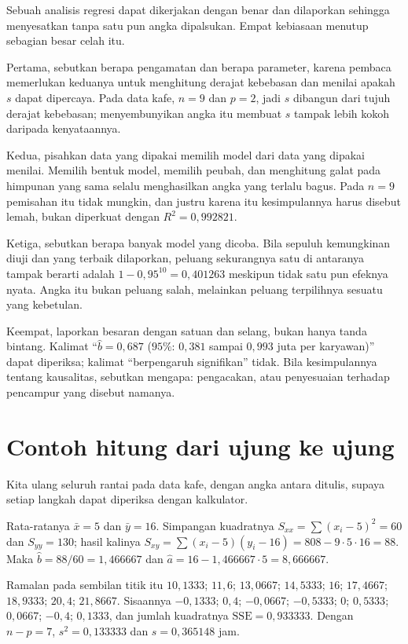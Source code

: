 Sebuah analisis regresi dapat dikerjakan dengan benar dan dilaporkan sehingga menyesatkan
tanpa satu pun angka dipalsukan. Empat kebiasaan menutup sebagian besar celah itu.

Pertama, sebutkan berapa pengamatan dan berapa parameter, karena pembaca memerlukan
keduanya untuk menghitung derajat kebebasan dan menilai apakah $s$ dapat dipercaya.
Pada data kafe, $n=9$ dan $p=2$, jadi $s$ dibangun dari tujuh derajat kebebasan;
menyembunyikan angka itu membuat $s$ tampak lebih kokoh daripada kenyataannya.

Kedua, pisahkan data yang dipakai memilih model dari data yang dipakai menilai.
Memilih bentuk model, memilih peubah, dan menghitung galat pada himpunan yang sama
selalu menghasilkan angka yang terlalu bagus. Pada $n=9$ pemisahan itu tidak mungkin,
dan justru karena itu kesimpulannya harus disebut lemah, bukan diperkuat dengan
$R^2=0{,}992821$.

Ketiga, sebutkan berapa banyak model yang dicoba. Bila sepuluh kemungkinan diuji dan
yang terbaik dilaporkan, peluang sekurangnya satu di antaranya tampak berarti adalah
$1-0{,}95^{10}=0{,}401263$ meskipun tidak satu pun efeknya nyata. Angka itu bukan
peluang salah, melainkan peluang terpilihnya sesuatu yang kebetulan.

Keempat, laporkan besaran dengan satuan dan selang, bukan hanya tanda bintang. Kalimat
``$\hat b=0{,}687$ ($95\%$: $0{,}381$ sampai $0{,}993$ juta per karyawan)'' dapat
diperiksa; kalimat ``berpengaruh signifikan'' tidak. Bila kesimpulannya tentang kausalitas,
sebutkan mengapa: pengacakan, atau penyesuaian terhadap pencampur yang disebut namanya.

\section{Contoh hitung dari ujung ke ujung}

Kita ulang seluruh rantai pada data kafe, dengan angka antara ditulis, supaya setiap
langkah dapat diperiksa dengan kalkulator.

Rata-ratanya $\bar x=5$ dan $\bar y=16$. Simpangan kuadratnya
$S_{xx}=\sum(x_i-5)^2=60$ dan $S_{yy}=130$; hasil kalinya
$S_{xy}=\sum(x_i-5)(y_i-16)=808-9\cdot5\cdot16=88$. Maka
$\hat b=88/60=1{,}466667$ dan $\hat a=16-1{,}466667\cdot5=8{,}666667$.

Ramalan pada sembilan titik itu $10{,}1333$; $11{,}6$; $13{,}0667$; $14{,}5333$;
$16$; $17{,}4667$; $18{,}9333$; $20{,}4$; $21{,}8667$. Sisaannya
$-0{,}1333$; $0{,}4$; $-0{,}0667$; $-0{,}5333$; $0$; $0{,}5333$; $0{,}0667$;
$-0{,}4$; $0{,}1333$, dan jumlah kuadratnya
$\mathrm{SSE}=0{,}933333$. Dengan $n-p=7$, $s^2=0{,}133333$ dan $s=0{,}365148$ jam.

